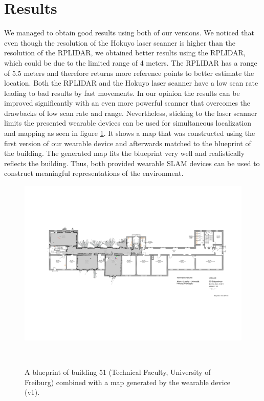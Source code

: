 \documentclass{sigchi-ext}
\begin{document}

\section{Results}
We managed to obtain good results using both of our versions. We noticed that even though the resolution of the Hokuyo laser scanner is higher than the resolution of the RPLIDAR, we obtained better results using the RPLIDAR, which could be due to the limited range of 4 meters. The RPLIDAR has a range of 5.5 meters and therefore returns more reference points to better estimate the location. Both the RPLIDAR and the Hokuyo laser scanner have a low scan rate leading to bad results by fast movements. In our opinion the results can be improved significantly with an even more powerful scanner that overcomes the drawbacks of low scan rate and range. Nevertheless, sticking to the laser scanner limits the presented wearable devices can be used for simultaneous localization and mapping as seen in figure \ref{fig:b51map}. It shows a map that was constructed using the first version of our wearable device and afterwards matched to the blueprint of the building. The generated map fits the blueprint very well and realistically reflects the building. Thus, both provided wearable SLAM devices can be used to construct meaningful representations of the environment.

\begin{figure}
	\includegraphics[width=\textwidth]{51.png}
	\caption{A blueprint of building 51 (Technical Faculty, University of Freiburg) combined with a map generated by the wearable device (v1).}~\label{fig:b51map}
\end{figure}

%
%

\balance{} 
\end{document}
